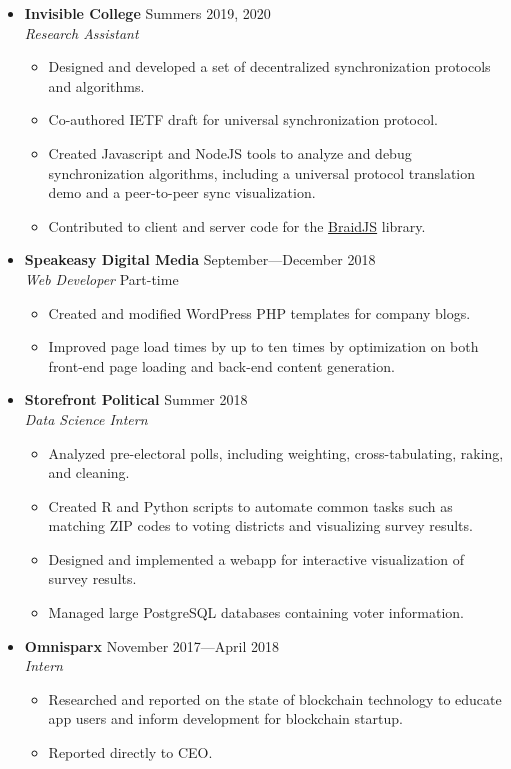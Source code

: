 \documentclass[12pt,letterpaper]{article}
\newenvironment{explist}
{\begin{itemize}[label=\textbf{--},itemsep=1pt,topsep=0pt,partopsep=0pt,parsep=0pt]}
{\end{itemize}}
\begin{document}
\begin{itemize}[label=]
    \item
	\textbf{Invisible College} \hfill Summers 2019, 2020\\
	\textit{Research Assistant}
	\begin{explist}
		\item Designed and developed a set of decentralized synchronization protocols and algorithms.
		\item Co-authored IETF draft for universal synchronization protocol.
		\item Created Javascript and NodeJS tools to analyze and debug synchronization algorithms, including a universal protocol translation demo and a peer-to-peer sync visualization.
        \item Contributed to client and server code for the \href{https://github.com/braid-work/braidjs}{BraidJS} library.
	\end{explist}

	\item
	\textbf{Speakeasy Digital Media} \hfill September---December 2018\\
	\textit{Web Developer} \hfill Part-time
	\begin{explist}
		\item Created and modified WordPress PHP templates for company blogs.
		\item Improved page load times by up to ten times by optimization on both front-end page loading and back-end content generation.
	\end{explist}
	
	\item
	\textbf{Storefront Political} \hfill Summer 2018\\
	\textit{Data Science Intern}
	\begin{explist}
		\item Analyzed pre-electoral polls, including weighting, cross-tabulating, raking, and cleaning.
		\item Created R and Python scripts to automate common tasks such as matching ZIP codes to voting districts and visualizing survey results.
		\item Designed and implemented a webapp for interactive visualization of survey results.
		\item Managed large PostgreSQL databases containing voter information.
	\end{explist}

    \item
    \textbf{Omnisparx} \hfill November 2017---April 2018\\
    \textit{Intern}
    \begin{explist}
        \item Researched and reported on the state of blockchain technology to educate app users and inform development for blockchain startup.
        \item Reported directly to CEO.
    \end{explist}

\end{itemize}
\end{document}

